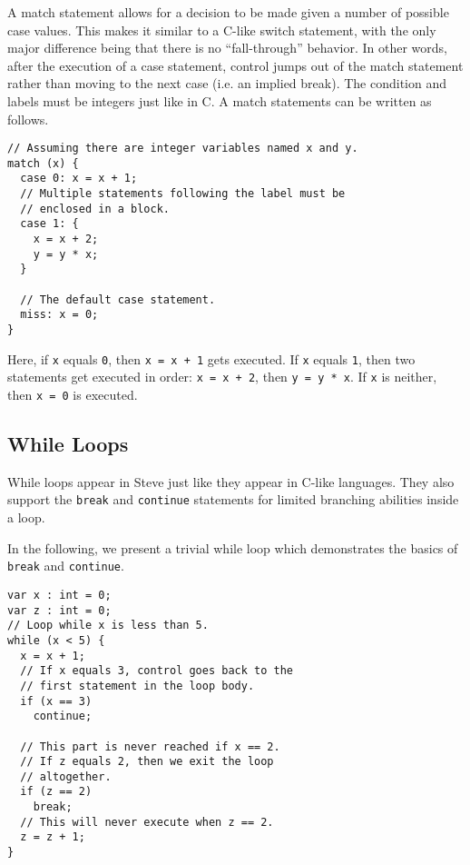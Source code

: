 A match statement allows for a decision to be made given a number of possible case values. This makes it similar to a C-like switch statement, with the only major difference being that there is no ``fall-through'' behavior. In other words, after the execution of a case statement, control jumps out of the match statement rather than moving to the next case (i.e. an implied break). The condition and labels must be integers just like in C. A match statements can be written as follows.

\begin{codepage}
\begin{lstlisting}
// Assuming there are integer variables named x and y.
match (x) {
  case 0: x = x + 1;
  // Multiple statements following the label must be
  // enclosed in a block.
  case 1: {
    x = x + 2;
    y = y * x;
  }

  // The default case statement.
  miss: x = 0;
}
\end{lstlisting}
\end{codepage}

Here, if \texttt{x} equals \texttt{0}, then \texttt{x = x + 1} gets executed. If \texttt{x} equals \texttt{1}, then two statements get executed in order: \texttt{x = x + 2}, then \texttt{y = y * x}. If \texttt{x} is neither, then \texttt{x = 0} is executed.

\subsection{While Loops} \label{tut:while}

While loops appear in Steve just like they appear in C-like languages. They also support the \texttt{break} and \texttt{continue} statements for limited branching abilities inside a loop.

In the following, we present a trivial while loop which demonstrates the basics of \texttt{break} and \texttt{continue}.

\begin{codepage}
\begin{lstlisting}
var x : int = 0;
var z : int = 0;
// Loop while x is less than 5.
while (x < 5) {
  x = x + 1;
  // If x equals 3, control goes back to the
  // first statement in the loop body.
  if (x == 3)
    continue;

  // This part is never reached if x == 2.
  // If z equals 2, then we exit the loop
  // altogether.
  if (z == 2)
    break;
  // This will never execute when z == 2.
  z = z + 1;
}
\end{lstlisting}
\end{codepage}

